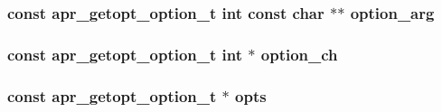 \subsubsection[{\texorpdfstring{option\+\_\+arg}{option_arg}}]{\setlength{\rightskip}{0pt plus 5cm}const {\bf apr\+\_\+getopt\+\_\+option\+\_\+t} {\bf int} const char $\ast$$\ast$ option\+\_\+arg}\hypertarget{group__apr__getopt_ga237497a2dba41f8f2e6999065f542e3e}{}\label{group__apr__getopt_ga237497a2dba41f8f2e6999065f542e3e}
\subsubsection[{\texorpdfstring{option\+\_\+ch}{option_ch}}]{\setlength{\rightskip}{0pt plus 5cm}const {\bf apr\+\_\+getopt\+\_\+option\+\_\+t} {\bf int} $\ast$ option\+\_\+ch}\hypertarget{group__apr__getopt_ga4684e1412a5bbd73e963c3dbb45dc3f0}{}\label{group__apr__getopt_ga4684e1412a5bbd73e963c3dbb45dc3f0}
\subsubsection[{\texorpdfstring{opts}{opts}}]{\setlength{\rightskip}{0pt plus 5cm}const {\bf apr\+\_\+getopt\+\_\+option\+\_\+t} $\ast$ opts}\hypertarget{group__apr__getopt_ga750f41de75ba000ae8bb4859e91835a1}{}\label{group__apr__getopt_ga750f41de75ba000ae8bb4859e91835a1}
